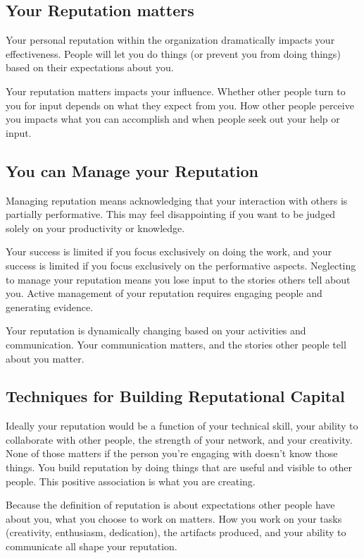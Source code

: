 \subsection*{Your Reputation matters}

Your personal reputation within the organization dramatically impacts your effectiveness. People will let you do things (or prevent you from doing things) based on their expectations about you. 

Your reputation matters impacts your influence. Whether other people turn to you for input depends on what they expect from you. How other people perceive you impacts what you can accomplish and when people seek out your help or input.

\subsection*{You can Manage your Reputation}

Managing reputation means acknowledging that your interaction with others is partially performative. This may feel disappointing if you want to be judged solely on your productivity or knowledge. 

Your success is limited if you focus exclusively on doing the work, and your success is limited if you focus exclusively on the performative aspects. 
Neglecting to manage your reputation means you lose input to the stories others tell about you. Active management of your reputation requires engaging people and generating evidence. 

Your reputation is dynamically changing based on your activities and communication. Your communication matters, and the stories other people tell about you matter.

\subsection*{Techniques for Building Reputational Capital}

Ideally your reputation would be a function of your technical skill, your ability to collaborate with other people, the strength of your network, and your creativity. None of those matters if the person you're engaging with doesn't know those things. 
You build reputation by doing things that are useful and visible to other people. This positive association is what you are creating.

Because the definition of reputation is about expectations other people have about you, what you choose to work on matters. How you work on your tasks (creativity, enthusiasm, dedication), the artifacts produced, and your ability to communicate all shape your reputation. 

